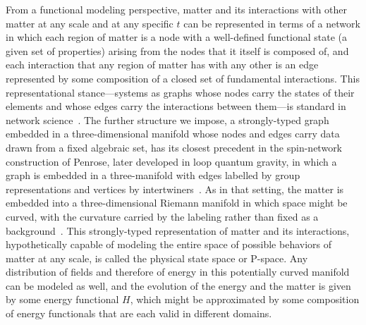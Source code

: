 \documentclass[10pt,twoside,a5paper]{article}
\theoremstyle{definition}
\begin{document}
From a functional modeling perspective, matter and its interactions
with other matter at any scale and at any specific $t$ can be
represented in terms of a network in which each region of matter is a
node with a well-defined functional state (a given set of properties)
arising from the nodes that it itself is composed of, and each
interaction that any region of matter has with any other is an edge
represented by some composition of a closed set of fundamental
interactions. This representational stance---systems as graphs whose
nodes carry the states of their elements and whose edges carry the
interactions between them---is standard in network
science~\cite{villegas2024networks}. The further structure we impose,
a strongly-typed graph embedded in a three-dimensional manifold whose
nodes and edges carry data drawn from a fixed algebraic set, has its
closest precedent in the spin-network construction of Penrose, later
developed in loop quantum gravity, in which a graph is embedded in a
three-manifold with edges labelled by group representations and
vertices by intertwiners~\cite{penrose1971spin, rovelli1995spin,
bianchi2009length}. As in that setting, the matter is embedded into a
three-dimensional Riemann manifold in which space might be curved,
with the curvature carried by the labeling rather than fixed as a
background~\cite{marcolli2010spinfoams}. This strongly-typed
representation of matter and its interactions, hypothetically capable
of modeling the entire space of possible behaviors of matter at any
scale, is called the physical state space or P-space. Any distribution
of fields and therefore of energy in this potentially curved manifold
can be modeled as well, and the evolution of the energy and the matter
is given by some energy functional $H$, which might be approximated by
some composition of energy functionals that are each valid in
different domains.
\end{document}
